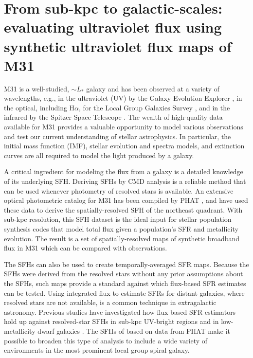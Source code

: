\section{From sub-kpc to galactic-scales: evaluating ultraviolet flux using
synthetic ultraviolet flux maps of M31}

M31 is a well-studied, $\sim L_\ast$ galaxy and has been observed at a variety
of wavelengths, e.g., in the ultraviolet (UV) by the Galaxy Evolution Explorer
\citep[GALEX;][]{Morrissey:2007}, in the optical, including H$\alpha$, for the
Local Group Galaxies Survey \citep{Massey:2006}, and in the infrared by the
Spitzer Space Telescope \citep{Gordon:2006}. The wealth of high-quality data
available for M31 provides a valuable opportunity to model various observations
and test our current understanding of stellar astrophysics. In particular, the
initial mass function (IMF), stellar evolution and spectra models, and
extinction curves are all required to model the light produced by a galaxy.

A critical ingredient for modeling the flux from a galaxy is a detailed
knowledge of its underlying SFH. Deriving SFHs by CMD analysis is a reliable
method that can be used whenever photometry of resolved stars is available. An
extensive optical photometric catalog for M31 has been compiled by PHAT
\citep{Dalcanton:2012}, and \citet{Lewis:2014} have used these data to derive
the spatially-resolved SFH of the northeast quadrant. With sub-kpc resolution,
this SFH dataset is the ideal input for stellar population synthesis codes that
model total flux given a population's SFR and metallicity evolution. The result
is a set of spatially-resolved maps of synthetic broadband flux in M31 which
can be compared with observations.

The \citet{Lewis:2014} SFHs can also be used to create temporally-averaged SFR
maps. Because the SFHs were derived from the resolved stars without any prior
assumptions about the SFHs, such maps provide a standard against which
flux-based SFR estimates \citep[e.g., using any of the calibrations
from][]{Kennicutt:2012} can be tested. Using integrated flux to estimate SFRs
for distant galaxies, where resolved stars are not available, is a common
technique in extragalactic astronomy. Previous studies have investigated how
flux-based SFR estimators hold up against resolved-star SFHs in sub-kpc
UV-bright regions \citep{Simones:2014} and in low-metallicity dwarf galaxies
\citep{McQuinn:2014}. The SFHs of \citet{Lewis:2014} based on data from PHAT
make it possible to broaden this type of analysis to include a wide variety of
environments in the most prominent local group spiral galaxy.

